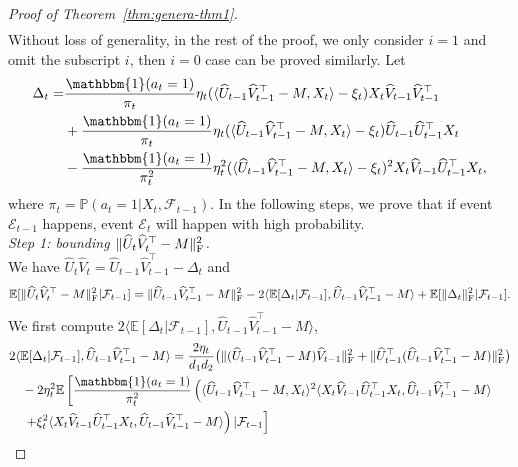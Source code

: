 \documentclass[12pt]{article}
\newcommand\fro[1]{\| #1 \|_{\rm{F}}}
\newcommand{\inp}[2]{\langle #1,#2\rangle}
\newcommand{\PP}{\mathbb{P}}
\def\EE{{\mathbb E}}
\def\PP{{\mathbb P}}
\theoremstyle{plain}
\begin{document}
\begin{proof}[Proof of Theorem~\ref{thm:genera-thm1}]
\begin{align*}
    \end{align*}
    Without loss of generality, in the rest of the proof, we only consider $i=1$ and omit the subscript $i$, then $i=0$ case can be proved similarly. Let
    \begin{align*}
        \Delta_t= &\frac{\mathbbm{1}(a_t=1)}{\pi_t}\eta_t(\inp{\widehat{U}_{t-1}\widehat{V}_{t-1}^{\top} - M}{X_t}-\xi_t)X_t\widehat{V}_{t-1}\widehat{V}_{t-1}^{\top} \\
        &+ \frac{\mathbbm{1}(a_t=1)}{\pi_t}\eta_t(\inp{\widehat{U}_{t-1}\widehat{V}_{t-1}^{\top}- M}{X_t}-\xi_t)\widehat{U}_{t-1}\widehat{U}_{t-1}^{\top}X_t \\
        &- \frac{\mathbbm{1}(a_t=1)}{\pi_t^2}\eta_t^2(\inp{\widehat{U}_{t-1}\widehat{V}_{t-1}^{\top}- M}{X_t}-\xi_t)^2X_t\widehat{V}_{t-1}\widehat{U}_{t-1}^{\top}X_t,
    \end{align*}
    where $\pi_t=\PP(a_t=1|X_t,\mathcal{F}_{t-1})$. In the following steps, we prove that if event $\mathcal{E}_{t-1}$ happens, event $\mathcal{E}_t$ will happen with high probability.\\
    \emph{Step 1: bounding $\fro{\widehat{U}_t\widehat{V}_t^{\top}-M}^2$.} \\
    We have $\widehat{U}_t\widehat{V}_t=\widehat{U}_{t-1}\widehat{V}_{t-1}^{\top}-\Delta_t$ and 
    \begin{align*}
        \EE[\fro{\widehat{U}_t\widehat{V}_t^{\top}-M}^2|\mathcal{F}_{t-1}]=\fro{\widehat{U}_{t-1}\widehat{V}_{t-1}^{\top}-M}^2-2\inp{\EE[\Delta_t|\mathcal{F}_{t-1}]}{\widehat{U}_{t-1}\widehat{V}_{t-1}^{\top}-M}+\EE[\fro{\Delta_t}^2|\mathcal{F}_{t-1}].
    \end{align*}
    We first compute $2\inp{\EE[\Delta_t|\mathcal{F}_{t-1}]}{\widehat{U}_{t-1}\widehat{V}_{t-1}^{\top}-M}$,
    \begin{align*}
        &2\inp{\EE[\Delta_t|\mathcal{F}_{t-1}]}{\widehat{U}_{t-1}\widehat{V}_{t-1}^{\top}-M} =  \frac{2\eta_t}{d_1d_2} \big(\fro{(\widehat{U}_{t-1}\widehat{V}_{t-1}^{\top} - M)\widehat{V}_{t-1}}^2 + \fro{\widehat{U}_{t-1}^{\top}(\widehat{U}_{t-1}\widehat{V}_{t-1}^{\top} - M)}^2\big)\\
        &\quad - 2\eta_t^2\EE\left[\frac{\mathbbm{1}(a_t=1)}{\pi_t^2}\left(\inp{\widehat{U}_{t-1}\widehat{V}_{t-1}^{\top}-M}{X_t}^2 \inp{X_t\widehat{V}_{t-1}\widehat{U}_{t-1}^{\top}X_t}{\widehat{U}_{t-1}\widehat{V}_{t-1}^{\top}-M} \right.\right.\\ 
        &\left.\left. \quad + \xi_t^2\inp{X_t\widehat{V}_{t-1}\widehat{U}_{t-1}^{\top}X_t}{\widehat{U}_{t-1}\widehat{V}_{t-1}^{\top}-M}\right)|\mathcal{F}_{t-1}\right]\\

\end{align*}
\end{proof}
\end{document}

